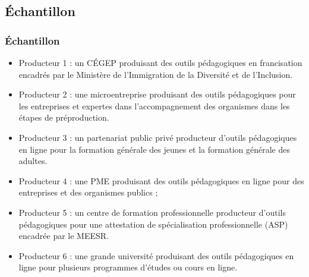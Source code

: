                       		 \subsection{Échantillon} 
					\begin{frame}[allowframebreaks]
						\frametitle{Échantillon}
                        
                        			\begin{itemize} 
                       				\item Producteur 1 : un CÉGEP produisant des outils pédagogiques en francisation encadrés par le Ministère de l’Immigration de la Diversité et de l'Inclusion.
                       				\item Producteur 2 : une microentreprise produisant des outils pédagogiques pour les entreprises et expertes dans l’accompagnement des organismes dans les étapes de préproduction.
							\item Producteur 3 : un partenariat public privé producteur d’outils pédagogiques en ligne pour la formation générale des jeunes et la formation générale des adultes.
							\item Producteur 4 : une PME produisant des outils pédagogiques en ligne pour des entreprises et des organismes publics ;
							\item Producteur 5 : un centre de formation professionnelle producteur d’outils pédagogiques pour une attestation de spécialisation professionnelle (ASP) encadrée par le MEESR.
							\item Producteur 6 : une grande université produisant des outils pédagogiques en ligne pour plusieurs programmes d’études ou cours en ligne.

                       		 \end{itemize}
                       		           
                \end{frame}
                       		 
